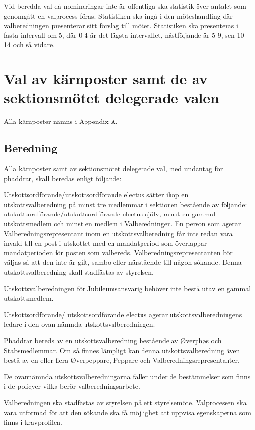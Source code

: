 \documentclass{dsekprotokoll}
\begin{document}
Vid beredda val då nomineringar inte är offentliga ska statistik över antalet som genomgått en valprocess föras. Statistiken ska ingå i den möteshandling där valberedningen presenterar sitt förslag till mötet. Statistiken ska presenteras i fasta intervall om 5, där 0-4
är det lägsta intervallet, nästföljande är 5-9, sen 10-14 och så
vidare.

\section{Val av kärnposter samt de av sektionsmötet delegerade valen}

Alla kärnposter nämns i Appendix A.

\subsection{Beredning}

Alla kärnposter samt av sektionsmötet delegerade val, med undantag för phaddrar, skall beredas enligt följande:

Utskottsordförande/utskottsordförande electus sätter ihop en utskottsvalberedning på minst tre medlemmar i sektionen bestående av följande: utskottsordförande/utskottsordförande electus själv, minst en gammal utskottsmedlem och minst en medlem i Valberedningen. En person som agerar Valberedningsrepresentant inom en utskottsvalberedning får inte
redan vara invald till en post i utskottet med en mandatperiod som överlappar mandatperioden för posten som valbereds. Valberedningsrepresentanten bör väljas så att den inte är gift, sambo eller närstående till någon sökande. Denna utskottsvalberedning skall stadfästas av styrelsen.

Utskottsvalberedningen för Jubileumsansvarig behöver inte bestå utav en gammal utskottsmedlem.

Utskottsordförande/ utskottsordförande electus agerar utskottsvalberedningens ledare i den ovan nämnda utskottsvalberedningen.

Phaddrar bereds av en utskottsvalberedning bestående av Øverphøs och Stabsmedlemmar. Om så
finnes lämpligt kan denna utskottsvalberedning även bestå av en eller flera Øverpeppare, Peppare
och Valberedningsrepresentanter.

De ovannämnda utskottsvalberedningarna faller under de bestämmelser som finns i de policyer
vilka berör valberedningsarbete.

Valberedningen ska stadfästas av styrelsen på ett styrelsemöte. Valprocessen ska vara utformad för att den sökande ska få möjlighet att uppvisa egenskaperna som finns i kravprofilen.
\end{document}
